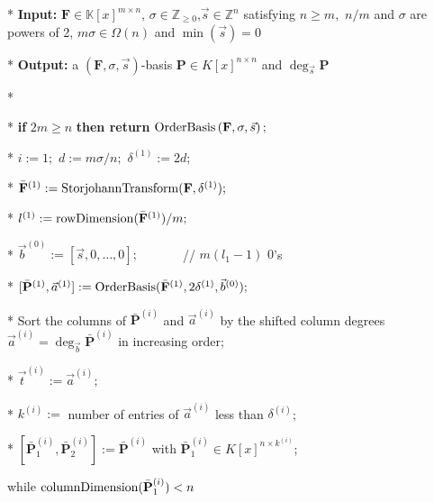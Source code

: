 \begin{algorithm}[t]
\caption{$\mmab\left(\mathbf{F},\sigma,\vec{s}\right)$ }


\label{alg:mab} 
\begin{algor}
\item [{{*}}] \textbf{Input:} $\mathbf{F}\in\mathbb{K}\left[x\right]^{m\times n}$,
$\sigma\in\mathbb{Z}_{\ge0}$,$\vec{s}\in\mathbb{Z}^{n}$ satisfying
$n\ge m,$ $n/m$ and $\sigma$ are powers of 2, $m\sigma\in\Omega(n)$
and $\min\left(\vec{s}\right)=0$ 
\item [{{*}}] \textbf{Output:} a $\left(\mathbf{F},\sigma,\vec{s}\right)$-basis
$\mathbf{P}\in K\left[x\right]^{n\times n}$ and $\deg_{\vec{s}}\mathbf{P}$
\item [{{*}}]~\end{algor}
\begin{algor}[1]
\item [{{*}}] \textbf{if }$2m\ge n$ \textbf{then return} $\mab\left(\mathbf{F},\sigma,\vec{s}\right);$ 
\item [{{{*}}}] $i:=1;$ $d:=m\sigma/n;$ $\delta^{\left(1\right)}:=2d;$ 
\item [{{{*}}}] $\bar{\mathbf{F}}^{\left(1\right)}:=\StorjohannTransform(\mathbf{F},\delta^{\left(1\right)});$ 
\item [{{{*}}}] $l^{\left(1\right)}:=\rowDimension(\bar{\mathbf{F}}^{\left(1\right)})/m;$ 
\item [{{{*}}}] $\vec{b}^{\left(0\right)}:=\left[\vec{s},0,\dots,0\right];$\ \ \ \ \ \ \ //
$m(l_{1}-1)$ $0$'s
\item [{{{*}}}] $[\bar{\mathbf{P}}^{\left(1\right)},\vec{a}^{\left(1\right)}]:=\mab(\bar{\mathbf{F}}^{\left(1\right)},2\delta^{\left(1\right)},\vec{b}^{\left(0\right)});$ 
\item [{{{*}}}] Sort the columns of $\bar{\mathbf{P}}^{\left(i\right)}$
and $\vec{a}^{\left(i\right)}$ by the shifted column degrees $\vec{a}^{\left(i\right)}=\deg_{\vec{b}}\bar{\mathbf{P}}^{\left(i\right)}$
in increasing order; 
\item [{{*}}] $\vec{t}^{\left(i\right)}:=\vec{a}^{\left(i\right)};$ 
\item [{{{*}}}] $k^{\left(i\right)}:=$ number of entries of $\vec{a}^{\left(i\right)}$
less than $\delta^{\left(i\right)}$;
\item [{{*}}] $[\bar{\mathbf{P}}_{1}^{\left(i\right)},\bar{\mathbf{P}}_{2}^{\left(i\right)}]:=\bar{\mathbf{P}}^{\left(i\right)}$
with $\bar{\mathbf{P}}_{1}^{\left(i\right)}\in K\left[x\right]^{n\times k^{\left(i\right)}}$;
\item [{{while}}] $\columnDimension(\bar{\mathbf{P}}_{1}^{\left(i\right)})<n$ 

\end{algor}
\end{algorithm}
